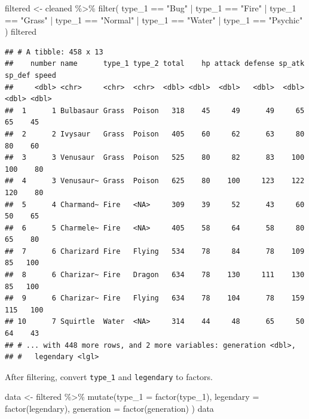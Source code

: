 \documentclass[
]{article}
\newenvironment{Shaded}{\begin{snugshade}}{\end{snugshade}}
\newcommand{\AttributeTok}[1]{\textcolor[rgb]{0.77,0.63,0.00}{#1}}
\newcommand{\FunctionTok}[1]{\textcolor[rgb]{0.00,0.00,0.00}{#1}}
\newcommand{\NormalTok}[1]{#1}
\newcommand{\OtherTok}[1]{\textcolor[rgb]{0.56,0.35,0.01}{#1}}
\newcommand{\SpecialCharTok}[1]{\textcolor[rgb]{0.00,0.00,0.00}{#1}}
\newcommand{\StringTok}[1]{\textcolor[rgb]{0.31,0.60,0.02}{#1}}
\begin{document}
\begin{Shaded}
\begin{Highlighting}[]
\NormalTok{filtered }\OtherTok{\textless{}{-}}\NormalTok{ cleaned }\SpecialCharTok{\%\textgreater{}\%} \FunctionTok{filter}\NormalTok{(}
\NormalTok{  type\_1 }\SpecialCharTok{==} \StringTok{"Bug"} \SpecialCharTok{|}\NormalTok{ type\_1 }\SpecialCharTok{==} \StringTok{"Fire"} \SpecialCharTok{|}\NormalTok{ type\_1 }\SpecialCharTok{==} \StringTok{"Grass"} 
  \SpecialCharTok{|}\NormalTok{ type\_1 }\SpecialCharTok{==} \StringTok{"Normal"} \SpecialCharTok{|}\NormalTok{ type\_1 }\SpecialCharTok{==} \StringTok{"Water"} \SpecialCharTok{|}\NormalTok{ type\_1 }\SpecialCharTok{==} \StringTok{"Psychic"}
\NormalTok{  )}
\NormalTok{filtered}
\end{Highlighting}
\end{Shaded}

\begin{verbatim}
## # A tibble: 458 x 13
##    number name      type_1 type_2 total    hp attack defense sp_atk sp_def speed
##     <dbl> <chr>     <chr>  <chr>  <dbl> <dbl>  <dbl>   <dbl>  <dbl>  <dbl> <dbl>
##  1      1 Bulbasaur Grass  Poison   318    45     49      49     65     65    45
##  2      2 Ivysaur   Grass  Poison   405    60     62      63     80     80    60
##  3      3 Venusaur  Grass  Poison   525    80     82      83    100    100    80
##  4      3 Venusaur~ Grass  Poison   625    80    100     123    122    120    80
##  5      4 Charmand~ Fire   <NA>     309    39     52      43     60     50    65
##  6      5 Charmele~ Fire   <NA>     405    58     64      58     80     65    80
##  7      6 Charizard Fire   Flying   534    78     84      78    109     85   100
##  8      6 Charizar~ Fire   Dragon   634    78    130     111    130     85   100
##  9      6 Charizar~ Fire   Flying   634    78    104      78    159    115   100
## 10      7 Squirtle  Water  <NA>     314    44     48      65     50     64    43
## # ... with 448 more rows, and 2 more variables: generation <dbl>,
## #   legendary <lgl>
\end{verbatim}

After filtering, convert \texttt{type\_1} and \texttt{legendary} to
factors.

\begin{Shaded}
\begin{Highlighting}[]
\NormalTok{data }\OtherTok{\textless{}{-}}\NormalTok{ filtered }\SpecialCharTok{\%\textgreater{}\%} 
  \FunctionTok{mutate}\NormalTok{(}\AttributeTok{type\_1 =} \FunctionTok{factor}\NormalTok{(type\_1),}
         \AttributeTok{legendary =} \FunctionTok{factor}\NormalTok{(legendary),}
         \AttributeTok{generation =} \FunctionTok{factor}\NormalTok{(generation)}
\NormalTok{         )}
\NormalTok{data}
\end{Highlighting}
\end{Shaded}
\end{document}
